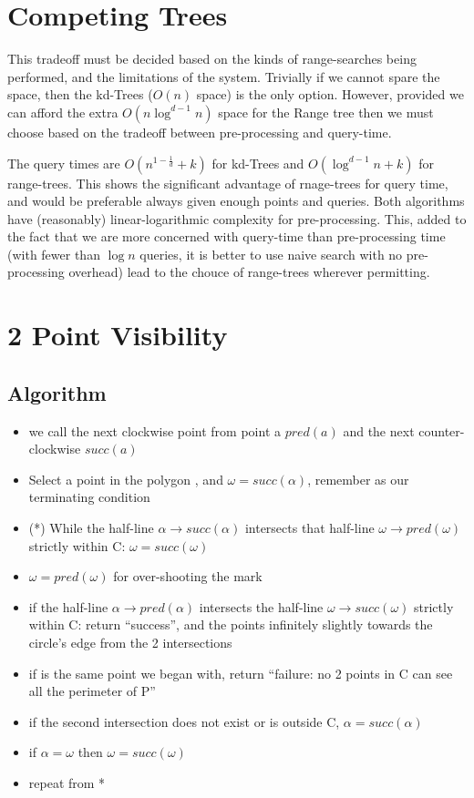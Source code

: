 \section {Competing Trees}
This tradeoff must be decided based on the kinds of range-searches being performed, and the limitations of the system.
Trivially if we cannot spare the space, then the kd-Trees ($O(n)$ space) is the only option.
However, provided we can afford the extra $O(n\log^{d-1}n)$ space for the Range tree then we must choose based on the tradeoff between pre-processing and query-time.

The query times are $O(n^{1-\frac{1}{d}} + k)$ for kd-Trees and $O(\log^{d-1}n+k)$ for range-trees.
This shows the significant advantage of rnage-trees for query time, and would be preferable always given enough points and queries.
Both algorithms have (reasonably) linear-logarithmic complexity for pre-processing.
This, added to the fact that we are more concerned with query-time than pre-processing time (with fewer than $\log n$ queries, it is better to use naive search with no pre-processing overhead) lead to the chouce of range-trees wherever permitting.

\section {2 Point Visibility}

\subsection{Algorithm}
\begin{itemize}
	\item we call the next clockwise point from point a $pred(a)$ and the next counter-clockwise $succ(a)$
	\item Select a point in the polygon \alpha, and $\omega = succ(\alpha)$, remember \alpha as our terminating condition
	\item (*) While the half-line $\alpha \rightarrow succ(\alpha)$ intersects that half-line $\omega \rightarrow pred(\omega)$ strictly within C: $\omega = succ(\omega)$
	\item $\omega = pred(\omega)$ for over-shooting the mark
	\item if the half-line $\alpha \rightarrow pred(\alpha)$ intersects the half-line $\omega \rightarrow succ(\omega)$ strictly within C: return ``success'', and the points infinitely slightly towards the circle's edge from the 2 intersections
	\item if \alpha is the same point we began with, return ``failure: no 2 points in C can see all the perimeter of P''
	\item if the second intersection does not exist or is outside C, $\alpha = succ(\alpha)$
	\item if $\alpha = \omega$ then $\omega = succ(\omega)$
	\item repeat from *
\end{itemize}

